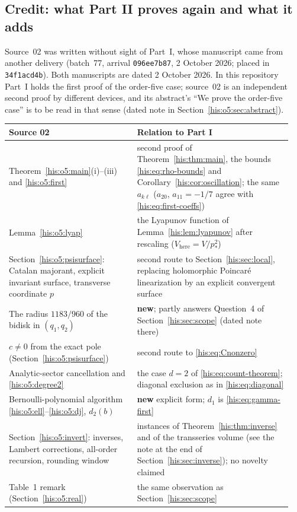 \documentclass[11pt]{article}
\theoremstyle{remark}\newtheorem{remark}[theorem]{Remark}
\numberwithin{equation}{section}
\begin{document}
\subsection{Credit: what Part II proves again and what it adds}\label{his:o5:sec:map}
Source~02 was written without sight of Part~I, whose manuscript came from another delivery (batch~77, arrival \texttt{096ee7b87}, 2 October 2026; placed in \texttt{34f1acd4b}). Both manuscripts are dated 2 October 2026. In this repository Part~I holds the first proof of the order-five case; source~02 is an independent second proof by different devices, and its abstract's ``We prove the order-five case'' is to be read in that sense (dated note in Section~\ref{his:o5:sec:abstract}).
\begin{center}\small
\begin{tabular}{@{}>{\raggedright\arraybackslash}p{0.43\linewidth}>{\raggedright\arraybackslash}p{0.52\linewidth}@{}}
\toprule
Source 02 & Relation to Part I\\
\midrule
Theorem~\ref{his:o5:main}(i)--(iii) and \eqref{his:o5:first} & second proof of Theorem~\ref{his:thm:main}, the bounds \eqref{his:eq:rho-bounds} and Corollary~\ref{his:cor:oscillation}; the same $a_{k\ell}$ ($a_{20}$, $a_{11}=-1/7$ agree with \eqref{his:eq:first-coeffs})\\
Lemma~\ref{his:o5:lyap} & the Lyapunov function of Lemma~\ref{his:lem:lyapunov} after rescaling ($V_{\text{here}}=V/p_*^2$)\\
Section~\ref{his:o5:psisurface}: Catalan majorant, explicit invariant surface, transverse coordinate $p$ & second route to Section~\ref{his:sec:local}, replacing holomorphic Poincar\'e linearization \cite{iy2008} by an explicit convergent surface\\
The radius $1183/960$ of the bidisk in $(q_1,q_2)$ & \textbf{new}; partly answers Question~4 of Section~\ref{his:sec:scope} (dated note there)\\
$c\ne0$ from the exact pole (Section~\ref{his:o5:psisurface}) & second route to \eqref{his:eq:Cnonzero}\\
Analytic-sector cancellation and \eqref{his:o5:degree2} & the case $d=2$ of \eqref{his:eq:count-theorem}; diagonal exclusion as in \eqref{his:eq:diagonal}\\
Bernoulli-polynomial algorithm \eqref{his:o5:ell}--\eqref{his:o5:dj}, $d_2(b)$ & \textbf{new} explicit form; $d_1$ is \eqref{his:eq:gamma-first}\\
Section~\ref{his:o5:invert}: inverses, Lambert corrections, all-order recursion, rounding window & instances of Theorem~\ref{his:thm:inverse} and of the transseries volume (see the note at the end of Section~\ref{his:sec:inverse}); no novelty claimed\\
Table~1 remark (Section~\ref{his:o5:real}) & the same observation as Section~\ref{his:sec:scope}\\
\bottomrule
\end{tabular}
\end{center}
\end{document}
